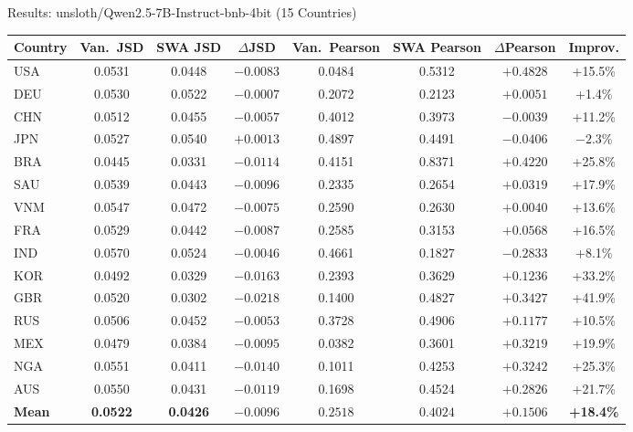 \documentclass[11pt, aspectratio=169]{beamer}
\begin{document}
\begin{frame}{Results: unsloth/Qwen2.5-7B-Instruct-bnb-4bit (15 Countries)}

\begin{table}
\centering
\scriptsize
\renewcommand{\arraystretch}{1.05}
\begin{tabular}{@{}l cc c cc c c@{}}
\toprule
\textbf{Country} & \textbf{Van.\ JSD} & \textbf{SWA JSD} & \textbf{$\Delta$JSD} & \textbf{Van.\ Pearson} & \textbf{SWA Pearson} & \textbf{$\Delta$Pearson} & \textbf{Improv.} \\
\midrule
USA & 0.0531 & 0.0448 & $-0.0083$ & 0.0484 & 0.5312 & $+0.4828$ & \textcolor{cbGreen}{+15.5\%} \\
DEU & 0.0530 & 0.0522 & $-0.0007$ & 0.2072 & 0.2123 & $+0.0051$ & \textcolor{cbGreen}{+1.4\%} \\
CHN & 0.0512 & 0.0455 & $-0.0057$ & 0.4012 & 0.3973 & \textcolor{alertred}{$-0.0039$} & \textcolor{cbGreen}{+11.2\%} \\
JPN & 0.0527 & 0.0540 & \textcolor{alertred}{$+0.0013$} & 0.4897 & 0.4491 & \textcolor{alertred}{$-0.0406$} & \textcolor{alertred}{$-2.3\%$} \\
BRA & 0.0445 & 0.0331 & $-0.0114$ & 0.4151 & 0.8371 & $+0.4220$ & \textcolor{cbGreen}{+25.8\%} \\
SAU & 0.0539 & 0.0443 & $-0.0096$ & 0.2335 & 0.2654 & $+0.0319$ & \textcolor{cbGreen}{+17.9\%} \\
\rowcolor{lightgray}
VNM & 0.0547 & 0.0472 & $-0.0075$ & 0.2590 & 0.2630 & $+0.0040$ & \textcolor{cbGreen}{+13.6\%} \\
FRA & 0.0529 & 0.0442 & $-0.0087$ & 0.2585 & 0.3153 & $+0.0568$ & \textcolor{cbGreen}{+16.5\%} \\
IND & 0.0570 & 0.0524 & $-0.0046$ & 0.4661 & 0.1827 & \textcolor{alertred}{$-0.2833$} & \textcolor{cbGreen}{+8.1\%} \\
KOR & 0.0492 & 0.0329 & $-0.0163$ & 0.2393 & 0.3629 & $+0.1236$ & \textcolor{cbGreen}{+33.2\%} \\
GBR & 0.0520 & 0.0302 & $-0.0218$ & 0.1400 & 0.4827 & $+0.3427$ & \textcolor{cbGreen}{+41.9\%} \\
RUS & 0.0506 & 0.0452 & $-0.0053$ & 0.3728 & 0.4906 & $+0.1177$ & \textcolor{cbGreen}{+10.5\%} \\
\rowcolor{lightgray}
MEX & 0.0479 & 0.0384 & $-0.0095$ & 0.0382 & 0.3601 & $+0.3219$ & \textcolor{cbGreen}{+19.9\%} \\
NGA & 0.0551 & 0.0411 & $-0.0140$ & 0.1011 & 0.4253 & $+0.3242$ & \textcolor{cbGreen}{+25.3\%} \\
AUS & 0.0550 & 0.0431 & $-0.0119$ & 0.1698 & 0.4524 & $+0.2826$ & \textcolor{cbGreen}{+21.7\%} \\
\midrule
\textbf{Mean} & \textbf{0.0522} & \textbf{0.0426} & $\mathbf{-0.0096}$ & $\mathbf{0.2518}$ & $\mathbf{0.4024}$ & $\mathbf{+0.1506}$ & \textcolor{cbGreen}{\textbf{+18.4\%}} \\
\bottomrule
\end{tabular}
\end{table}

\end{frame}
\end{document}
